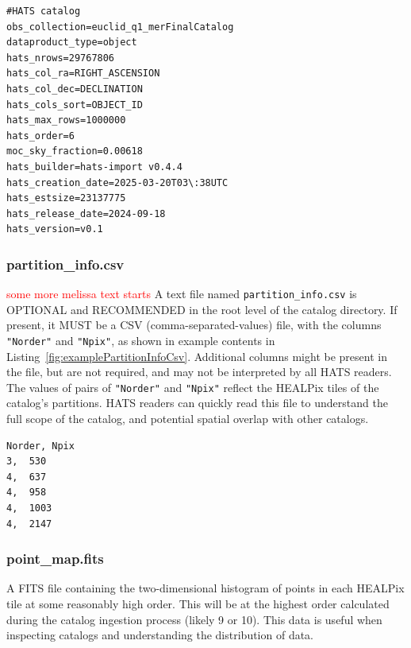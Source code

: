 \documentclass[11pt,a4paper]{ivoa}
\begin{document}
\begin{minipage}{\linewidth}
\begin{lstlisting}[caption=Example \texttt{properties} file contents, label=fig:examplePropertiesFile]
#HATS catalog
obs_collection=euclid_q1_merFinalCatalog
dataproduct_type=object
hats_nrows=29767806
hats_col_ra=RIGHT_ASCENSION
hats_col_dec=DECLINATION
hats_cols_sort=OBJECT_ID
hats_max_rows=1000000
hats_order=6
moc_sky_fraction=0.00618
hats_builder=hats-import v0.4.4
hats_creation_date=2025-03-20T03\:38UTC
hats_estsize=23137775
hats_release_date=2024-09-18
hats_version=v0.1
\end{lstlisting}
\end{minipage}




\subsubsection{partition\_info.csv} 


    \textcolor{red}{some more melissa text starts}
A text file named \texttt{partition\_info.csv} is OPTIONAL and RECOMMENDED in the root level of the catalog directory.
If present, it MUST be a CSV (comma-separated-values) file, with the columns \texttt{"Norder"} and \texttt{"Npix"}, as shown in example contents in Listing~\ref{fig:examplePartitionInfoCsv}.
Additional columns might be present in the file, but are not required, and may not be interpreted by all HATS readers.
The values of pairs of \texttt{"Norder"} and \texttt{"Npix"} reflect the HEALPix tiles of the catalog's partitions. 
HATS readers can quickly read this file to understand the full scope of the catalog, and potential spatial overlap with other catalogs.


\begin{minipage}{\linewidth}
\begin{lstlisting}[caption=Example \texttt{partition\_info.csv} file contents, label=fig:examplePartitionInfoCsv]    
Norder,	Npix
3,	530
4,	637
4,	958
4,	1003
4,	2147
\end{lstlisting}
\end{minipage}

\subsubsection{point\_map.fits} 

A FITS file containing the two-dimensional histogram of points in each HEALPix tile at some reasonably high order.
This will be at the highest order calculated during the catalog ingestion process (likely 9 or 10). 
This data is useful when inspecting catalogs and understanding the distribution of data. 
\end{document}
